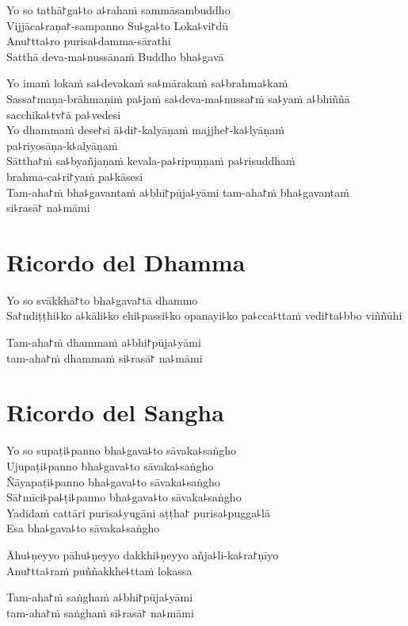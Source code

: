 Yo so tathā꜓ga꜕to a꜕rahaṁ sammāsambuddho\\
Vijjāca꜕raṇa꜓-sampanno Su꜕ga꜕to Loka꜕vi꜓dū\\
Anu꜓tta꜕ro purisa꜕damma-sārathi\\
Satthā deva-ma꜕nussānaṁ Buddho bha꜕gavā

Yo imaṁ lokaṁ sa꜕devakaṁ sa꜕mārakaṁ sa꜕brahma꜕kaṁ\\
Sassa꜓maṇa-brāhmaṇiṁ pa꜕jaṁ sa꜕deva-ma꜕nussa꜓ṁ sa꜕yaṁ a꜕bhiññā sacchika꜕tv꜓ā pa꜕vedesi\\
Yo dhammaṁ dese꜓si ā꜕di꜓-kalyāṇaṁ majjhe꜓-ka꜕lyāṇaṁ\\
pa꜕riyosāṇa-k꜕alyāṇaṁ\\
Sāttha꜓ṁ sa꜕byañjaṇaṁ kevala-pa꜕ripuṇṇaṁ pa꜕risuddhaṁ\\
brahma-ca꜕ri꜓yaṁ pa꜕kāsesi\\

Tam-aha꜓ṁ bha꜕gavantaṁ a꜕bhi꜓pūja꜕yāmi tam-aha꜓ṁ bha꜕gavantaṁ\\
si꜕rasā꜓ na꜕māmi 

\chapter{Ricordo del Dhamma}     %

\begin{leader}
\end{leader}

Yo so svākkhā꜓to bha꜕gava꜓tā dhammo\\
Sa꜓ndiṭṭhi꜕ko a꜕kāli꜕ko ehi꜕passi꜕ko opanayi꜕ko pa꜕cca꜕ttaṁ vedi꜓ta꜕bbo viññūhi

Tam-aha꜓ṁ dhammaṁ a꜕bhi꜓pūja꜕yāmi\\
\vin tam-aha꜓ṁ dhammaṁ si꜕rasā꜓ na꜕māmi 

\enlargethispage{\baselineskip}
\clearpage

\chapter{Ricordo del Sangha}     %

\begin{leader}
\end{leader}

Yo so supaṭi꜕panno bha꜕gava꜕to sāvaka꜕saṅgho\\
Ujupaṭi꜕panno bha꜕gava꜕to sāvaka꜕saṅgho\\
Ñāyapaṭi꜕panno bha꜕gava꜕to sāvaka꜕saṅgho\\
Sā꜓mīci꜕pa꜕ṭi꜕panno bha꜕gava꜕to sāvaka꜕saṅgho\\
Yadidaṁ cattāri purisa꜕yugāni aṭṭha꜓ purisa꜕pugga꜕lā\\
Esa bha꜕gava꜕to sāvaka꜕saṅgho

Āhu꜕ṇeyyo pāhu꜕ṇeyyo dakkhi꜕ṇeyyo añja꜕li-ka꜕ra꜓ṇīyo\\
Anu꜓tta꜕raṁ puññakkhe꜕ttaṁ lokassa

Tam-aha꜓ṁ saṅghaṁ a꜕bhi꜓pūja꜕yāmi\\
\vin tam-aha꜓ṁ saṅghaṁ si꜕rasā꜓ na꜕māmi 


